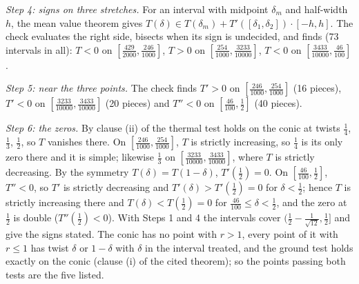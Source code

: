 \emph{Step 4: signs on three stretches.} For an interval with midpoint $\delta_{m}$ and half-width $h$, the mean value theorem gives $T(\delta) \in T(\delta_{m}) + T'([\delta_{1}, \delta_{2}])\cdot[-h, h]$. The check evaluates the right side, bisects when its sign is undecided, and finds (73 intervals in all): $T < 0$ on $[\tfrac{429}{2000}, \tfrac{246}{1000}]$, $T > 0$ on $[\tfrac{254}{1000}, \tfrac{3233}{10000}]$, $T < 0$ on $[\tfrac{3433}{10000}, \tfrac{46}{100}]$.

\emph{Step 5: near the three points.} The check finds $T' > 0$ on $[\tfrac{246}{1000}, \tfrac{254}{1000}]$ (16 pieces), $T' < 0$ on $[\tfrac{3233}{10000}, \tfrac{3433}{10000}]$ (20 pieces) and $T'' < 0$ on $[\tfrac{46}{100}, \tfrac12]$ (40 pieces).

\emph{Step 6: the zeros.} By clause (ii) of  the thermal test holds on the conic at twists $\tfrac14$, $\tfrac13$, $\tfrac12$, so $T$ vanishes there. On $[\tfrac{246}{1000}, \tfrac{254}{1000}]$, $T$ is strictly increasing, so $\tfrac14$ is its only zero there and it is simple; likewise $\tfrac13$ on $[\tfrac{3233}{10000}, \tfrac{3433}{10000}]$, where $T$ is strictly decreasing. By the symmetry $T(\delta) = T(1 - \delta)$, $T'(\tfrac12) = 0$. On $[\tfrac{46}{100}, \tfrac12]$, $T'' < 0$, so $T'$ is strictly decreasing and $T'(\delta) > T'(\tfrac12) = 0$ for $\delta < \tfrac12$; hence $T$ is strictly increasing there and $T(\delta) < T(\tfrac12) = 0$ for $\tfrac{46}{100} \le \delta < \tfrac12$, and the zero at $\tfrac12$ is double ($T''(\tfrac12) < 0$). With Steps 1 and 4 the intervals cover $(\tfrac12 - \tfrac{1}{\sqrt{12}}, \tfrac12]$ and give the signs stated. The conic has no point with $r > 1$, every point of it with $r \le 1$ has twist $\delta$ or $1 - \delta$ with $\delta$ in the interval treated, and the ground test holds exactly on the conic (clause (i) of the cited theorem); so the points passing both tests are the five listed.
